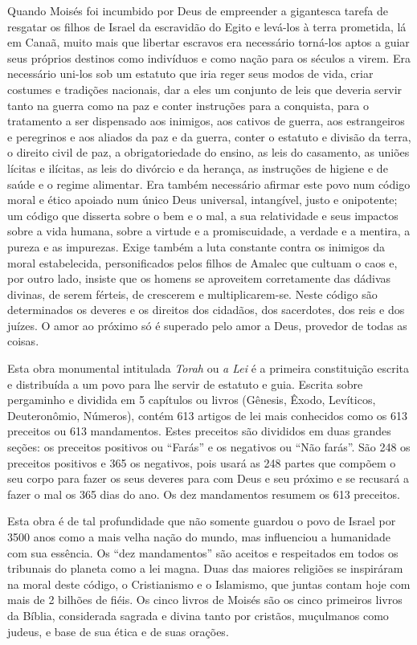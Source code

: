 Quando Moisés foi incumbido por Deus de empreender a gigantesca tarefa
de resgatar os filhos de Israel da escravidão do Egito e levá-los à
terra prometida, lá em Canaã, muito mais que libertar escravos era
necessário torná-los aptos a guiar seus próprios destinos como
indivíduos e como nação para os séculos a virem. Era necessário uni-los
sob um estatuto que iria reger seus modos de vida, criar costumes e
tradições nacionais, dar a eles um conjunto de leis que deveria servir
tanto na guerra como na paz e conter instruções para a conquista, para o
tratamento a ser dispensado aos inimigos, aos cativos de guerra, aos
estrangeiros e peregrinos e aos aliados da paz e da guerra, conter o
estatuto e divisão da terra, o direito civil de paz, a obrigatoriedade
do ensino, as leis do casamento, as uniões lícitas e ilícitas, as leis
do divórcio e da herança, as instruções de higiene e de saúde e o regime
alimentar. Era também necessário afirmar este povo num código moral e
ético apoiado num único Deus universal, intangível, justo e onipotente;
um código que disserta sobre o bem e o mal, a sua relatividade e seus
impactos sobre a vida humana, sobre a virtude e a promiscuidade, a
verdade e a mentira, a pureza e as impurezas. Exige também a luta
constante contra os inimigos da moral estabelecida, personificados
pelos filhos de Amalec que cultuam o caos e, por outro lado, insiste que
os homens se aproveitem corretamente das dádivas divinas, de serem
férteis, de crescerem e multiplicarem-se. Neste código são determinados
os deveres e os direitos dos cidadãos, dos sacerdotes, dos reis e dos
juízes. O amor ao próximo só é superado pelo amor a Deus, provedor de
todas as coisas.

Esta obra monumental intitulada \emph{Torah} ou \emph{a Lei} é a
primeira constituição escrita e distribuída a um povo para lhe servir
de estatuto e guia. Escrita sobre pergaminho e dividida em 5 capítulos
ou livros (Gênesis, Êxodo, Levíticos, Deuteronômio, Números), contém 613
artigos de lei mais conhecidos como os 613 preceitos ou 613 mandamentos.
Estes preceitos são divididos em duas grandes seções: os preceitos
positivos ou ``Farás'' e os negativos ou ``Não farás''. São 248 os
preceitos positivos e 365 os negativos, pois usará as 248 partes que
compõem o seu corpo para fazer os seus deveres para com Deus e seu
próximo e se recusará a fazer o mal os 365 dias do ano. Os dez
mandamentos resumem os 613 preceitos.

Esta obra é de tal profundidade que não somente guardou o povo de Israel
por 3500 anos como a mais velha nação do mundo, mas influenciou a
humanidade com sua essência. Os ``dez mandamentos'' são aceitos e
respeitados em todos os tribunais do planeta como a lei magna. Duas das
maiores religiões se inspiráram na moral deste código, o Cristianismo e
o Islamismo, que juntas contam hoje com mais de 2 bilhões de fiéis. Os
cinco livros de Moisés são os cinco primeiros livros da Bíblia,
considerada sagrada e divina tanto por cristãos, muçulmanos como judeus,
e base de sua ética e de suas orações.

